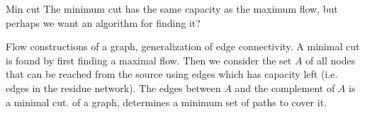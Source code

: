 \begin{algorithm}{Min cut}
\desc
The minimum cut has the same capacity as the maximum flow,
but perhaps we want an algorithm for finding it?
\end{algorithm}

\begin{algorithm}{Flow constructions}
 of a graph, generalization of edge connectivity. A
minimal cut is found by first finding a maximal flow. Then we consider the
set $A$ of all nodes that can be reached from the source using edges which
has capacity left (i.e. edges in the residue network). The edges between
$A$ and the complement of $A$ is a minimal cut.
 of a graph, determines a minimum set of paths to
cover it.
\end{algorithm}
